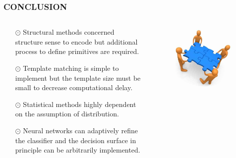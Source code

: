 \documentclass{beamer}
\begin{document}
\begin{frame}
\transdissolve

\frametitle{CONCLUSION}
\begin{columns}
\begin{column}{.7\textwidth}
\begin{itemize}
\item[$\odot$] Structural methods concerned structure sense to encode but additional process to define primitives are required.%
\item[$\odot$] Template matching is simple to implement but the template size must be small to decrease computational delay.%
\item[$\odot$] Statistical methods highly dependent on the assumption of distribution.%
\item[$\odot$] Neural networks can adaptively refine the classifier and the decision surface in principle can be arbitrarily implemented.%
\end{itemize}
\end{column}
\begin{column}{.6\textwidth}
\begin{figure}
\includegraphics[width=.5\textwidth]{conclusion.jpg}%
\end{figure}
\end{column}
\end{columns}
\end{frame}
\end{document}
